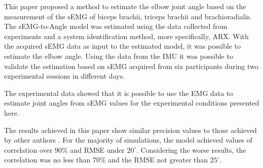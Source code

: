 \documentclass[letterpaper, 10 pt, conference]{ieeeconf}  %
\begin{document}
This paper proposed a method to estimate the elbow joint angle based on the measurement of the sEMG of biceps brachii, triceps brachii and brachioradialis. The sEMG-to-Angle model was estimated using the data collected from experiments and a system identification method, more specifically, ARX. With the acquired sEMG data as input to the estimated model, it was possible to estimate the elbow angle. Using the data from the IMU it was possible to validate the estimation based on sEMG acquired from six participants during two experimental sessions in different days.


The experimental data showed that it is possible to use the EMG data to estimate joint angles from sEMG values for the experimental conditions presented here.


The results achieved in this paper show similar precision values to those achieved by other authors  \cite{Pang2015165,Liu1999391,Rahmatian2016158,Mamikoglu2016785}. For the majority of simulations, the model achieved values of correlation over $90\%$ and RMSE under $20^\circ$. Considering the worse results, the correlation was no less than $70\%$ and the RMSE not greater than $25^\circ$.



\end{document}
